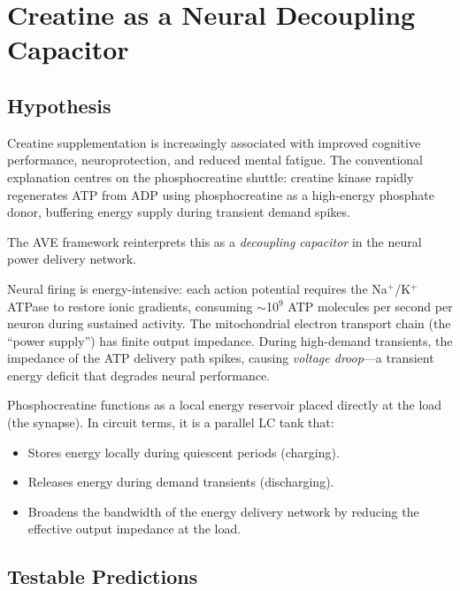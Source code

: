 \section{Creatine as a Neural Decoupling Capacitor}
\label{sec:creatine_brain}

\subsection{Hypothesis}

Creatine supplementation is increasingly associated with improved
cognitive performance, neuroprotection, and reduced mental fatigue.
The conventional explanation centres on the phosphocreatine shuttle:
creatine kinase rapidly regenerates ATP from ADP using
phosphocreatine as a high-energy phosphate donor, buffering energy
supply during transient demand spikes.

The AVE framework reinterprets this as a \emph{decoupling capacitor}
in the neural power delivery network.

Neural firing is energy-intensive: each action potential requires
the Na$^+$/K$^+$ ATPase to restore ionic gradients, consuming
$\sim$10$^9$ ATP molecules per second per neuron during sustained
activity.  The mitochondrial electron transport chain (the ``power
supply'') has finite output impedance.  During high-demand
transients, the impedance of the ATP delivery path spikes, causing
\emph{voltage droop}---a transient energy deficit that degrades
neural performance.

Phosphocreatine functions as a local energy reservoir placed
directly at the load (the synapse).  In circuit terms, it is a
parallel LC tank that:
\begin{itemize}
  \item Stores energy locally during quiescent periods (charging).
  \item Releases energy during demand transients (discharging).
  \item Broadens the bandwidth of the energy delivery network by
        reducing the effective output impedance at the load.
\end{itemize}

\subsection{Testable Predictions}

